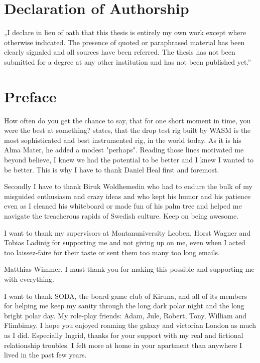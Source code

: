 
\setcounter{page}{2}

\normalsize

\chapter*{Declaration of Authorship}

„I declare in lieu of oath that this thesis is entirely my own work except where
otherwise indicated. The presence of quoted or paraphrased material has been clearly
signaled and all sources have been referred. The thesis has not been submitted for a degree
at any other institution and has not been published yet.”

\chapter*{Preface}
%

How often do you get the chance to say, that for one short moment in time, you were the best at something? 
\textcite[93]{Heal10} states, that the drop test rig built by WASM is the most sophisticated and best instrumented rig, in the world today. As it is his Alma Mater, he added a modest "perhaps". 
Reading those lines motivated me beyond believe, I knew we had the potential to be better and I knew I wanted to be better. This is why I have to thank Daniel Heal first and foremost.

Secondly I have to thank Biruk Woldhemedin who had to endure the bulk of my misguided enthusiasm and crazy ideas and who kept his humor and his patience even as I cleaned his whiteboard or made fun of his palm tree and helped me navigate the treacherous rapids of Swedish culture. Keep on being awesome.

I want to thank my supervisors at Montanuniversity Leoben, Horst Wagner and Tobias Ladinig for supporting me and not giving up on me, even when I acted too laissez-faire for their taste or sent them too many too long emails.

Matthias Wimmer, I must thank you for making this possible and supporting me with everything. 

I want to thank SODA, the board game club of Kiruna, and all of its members for helping me keep my sanity through the long dark polar night and the long bright polar day. My role-play friends: Adam, Jule, Robert, Tony, William and Flimbimsy. I hope you enjoyed roaming the galaxy and victorian London as much as I did.
Especially Ingrid, thanks for your support with my real and fictional relationship troubles. I felt more at home in your apartment than anywhere I lived in the past few years. 

